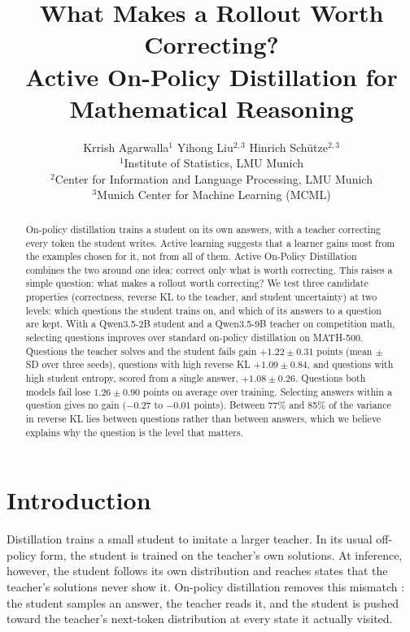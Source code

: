 \documentclass[11pt]{article}
\title{What Makes a Rollout Worth Correcting?\\Active On-Policy Distillation for Mathematical Reasoning}
\author{Krrish Agarwalla$^{1}$ \quad Yihong Liu$^{2,3}$ \quad Hinrich Sch\"{u}tze$^{2,3}$ \\
  $^{1}$Institute of Statistics, LMU Munich \\
  $^{2}$Center for Information and Language Processing, LMU Munich \\
  $^{3}$Munich Center for Machine Learning (MCML)}
\begin{document}
\maketitle

\begin{abstract}
On-policy distillation trains a student on its own answers, with a teacher correcting every token the student writes.
Active learning suggests that a learner gains most from the examples chosen for it, not from all of them.
Active On-Policy Distillation combines the two around one idea: correct only what is worth correcting.
This raises a simple question: what makes a rollout worth correcting?
We test three candidate properties (correctness, reverse KL to the teacher, and student uncertainty) at two levels: which questions the student trains on, and which of its answers to a question are kept.
With a Qwen3.5-2B student and a Qwen3.5-9B teacher on competition math, selecting questions improves over standard on-policy distillation on MATH-500.
Questions the teacher solves and the student fails gain $+1.22 \pm 0.31$ points (mean $\pm$ SD over three seeds), questions with high reverse KL $+1.09 \pm 0.84$, and questions with high student entropy, scored from a single answer, $+1.08 \pm 0.26$.
Questions both models fail lose $1.26 \pm 0.90$ points on average over training.
Selecting answers within a question gives no gain ($-0.27$ to $-0.01$ points).
Between 77\% and 85\% of the variance in reverse KL lies between questions rather than between answers, which we believe explains why the question is the level that matters.
\end{abstract}

\section{Introduction}
\label{sec:intro}

Distillation trains a small student to imitate a larger teacher.
In its usual off-policy form, the student is trained on the teacher's own solutions.
At inference, however, the student follows its own distribution and reaches states that the teacher's solutions never show it.
On-policy distillation removes this mismatch \citep{agarwal2024gkd,gu2024minillm,lu2025opd}: the student samples an answer, the teacher reads it, and the student is pushed toward the teacher's next-token distribution at every state it actually visited.
\end{document}
